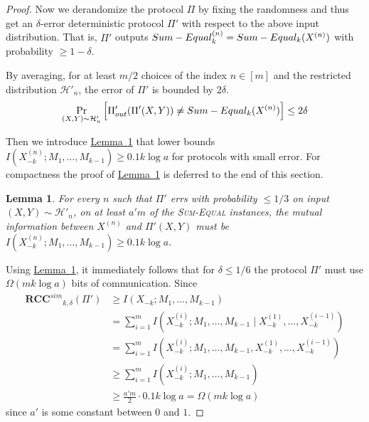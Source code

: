 \documentclass[11pt]{article}
\numberwithin{equation}{section}
\newtheorem{lemma}[theorem]{Lemma}
\theoremstyle{definition}
\theoremstyle{plain}
\newcommand{\expref}[2]{\hyperref[#2]{#1~\ref{#2}}}
\newcommand{\cond}{\;|\;}
\newcommand{\follows}{\ensuremath{\sim}}
\newcommand{\error}{\ensuremath{\delta}}
\newcommand{\bigomega}[1]{\ensuremath{{\Omega \left( {#1} \right)}}}
\newcommand{\rccsim}{\ensuremath{\mathbf{RCC}^{sim}}}
\newcommand{\sumequal}{\textsc{Sum-Equal} }
\begin{document}
\begin{proof}
	Now we derandomize the protocol $\Pi$ by fixing the randomness and thus get an $\error$-error deterministic protocol $\Pi'$ with respect to the above input distribution.
	That is, $\Pi'$ outputs $\sumequal_k^{(n)}=\sumequal_k(X^{(n)})$ with probability $\ge 1-\error$.

	By averaging, for at least $m/2$ choices of the index $n\in [m]$ and the restricted distribution $\mathcal{H}'_n$,
	the error of $\Pi'$ is bounded by $2\error$.
	\begin{align}
		\Pr_{(X,Y)\follows \mathcal{H}'_n}\left[ \Pi'_{out}(\Pi'(X,Y)) \ne \sumequal_k(X^{(n)}) \right] \le 
	2\error
	\end{align}

	Then we introduce \expref{Lemma}{lemma: lb mutual information} that 
	lower bounds $I\left(X^{(n)}_{-k}; M_1,\ldots, M_{k-1}\right)\ge 0.1{k\log a}$ for protocols with small error.
	For compactness the proof of \expref{Lemma}{lemma: lb mutual information} is deferred to the end of this section.

	\begin{lemma}\label{lemma: lb mutual information}
		For every $n$  such that $\Pi'$ errs with probability $\le 1/3$ on input  $(X,Y)\follows \mathcal{H}'_n$, on at least $a'm$ of the \sumequal instances,
		the mutual information between $X^{(n)}$ and $\Pi'(X,Y)$ must be
		$I\left(X^{(n)}_{-k}; M_1,\ldots, M_{k-1}\right)\ge 0.1{k\log a}$.
	\end{lemma}

	Using \expref{Lemma}{lemma: lb mutual information}, it immediately follows that for $\error \le 1/6$ the protocol $\Pi'$ must use $\bigomega{mk\log a}$ bits of communication.
	Since
	\begin{align*}
	 	\rccsim_{k,\error}(\Pi') & \ge I\left(X_{-k}; M_1,\dots,M_{k-1} \right)\\
	 	& = \sum_{i=1}^m I\left(X^{(i)}_{-k}; M_1,\dots,M_{k-1}\cond X^{(1)}_{-k},\ldots,X^{(i-1)}_{-k} \right)\\
	 	& = \sum_{i=1}^m I\left(X^{(i)}_{-k}; M_1,\dots,M_{k-1}, X^{(1)}_{-k},\ldots,X^{(i-1)}_{-k} \right)\\
	 	& \ge \sum_{i=1}^m I\left(X^{(i)}_{-k}; M_1,\dots,M_{k-1} \right)\\
	 	& \ge \frac{a'm}{2}\cdot 0.1 k\log a =\bigomega{mk\log a}
	\end{align*} 
	since $a'$ is some constant between $0$ and $1$.
\end{proof}	
\end{document}
